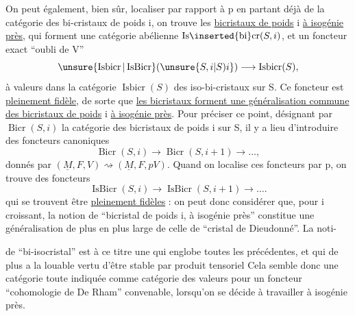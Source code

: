 On peut également, bien sûr, localiser par rapport à p en partant déjà de la catégorie des bi-cristaux de poids i, on trouve les \uline{bicristaux de poids} i \uline{à isogénie près}, qui forment une catégorie abélienne $\mathrm{Is}\inserted{\mathrm{bi}}\mathrm{cr}(S,i)$, et un foncteur exact ``oubli de V''
\[
\unsure{\operatorname{Isbicr}|\operatorname{IsBicr}}(\unsure{S,i|S)i})\longrightarrow\operatorname{Isbicr}(S),
\]
à valeurs dans la catégorie $\operatorname{Isbicr}(S)$ des iso-bi-cristaux sur S. Ce foncteur est  \uline{pleinement fidèle}, de sorte que \uline{les bicristaux forment une généralisation commune des bicristaux de poids} i \uline{à isogénie près}. Pour préciser ce point, désignant par $\operatorname{Bicr}(S,i)$ la catégorie des bicristaux de poids i sur S, il y a lieu d'introduire des foncteurs canoniques
\[
\operatorname{Bicr}(S,i)\longrightarrow\operatorname{Bicr}(S,i+1)\longrightarrow\ldots,
\]
donnés par $(\underline M,F,V)\rightsquigarrow(\underline M,F,pV)$. Quand on localise ces foncteurs par p, on trouve des foncteurs
\[
\operatorname{IsBicr}(S,i)\longrightarrow\operatorname{IsBicr}(S,i+1)\longrightarrow\ldots.
\]
qui se trouvent être \uline{pleinement fidèles} : on peut donc considérer que, pour i croissant, la notion de ``bicristal de poids i, à isogénie près'' constitue une généralisation de plus en plus large de celle de ``cristal de Dieudonné''. La noti-



de ``bi-isocristal'' est à ce titre une   qui englobe toutes les précédentes, et qui de plus a la louable vertu d'être stable par produit tensoriel  Cela semble donc une catégorie toute indiquée  comme catégorie des valeurs pour un foncteur ``cohomologie de De Rham'' convenable, lorsqu'on se décide à travailler à isogénie près.

